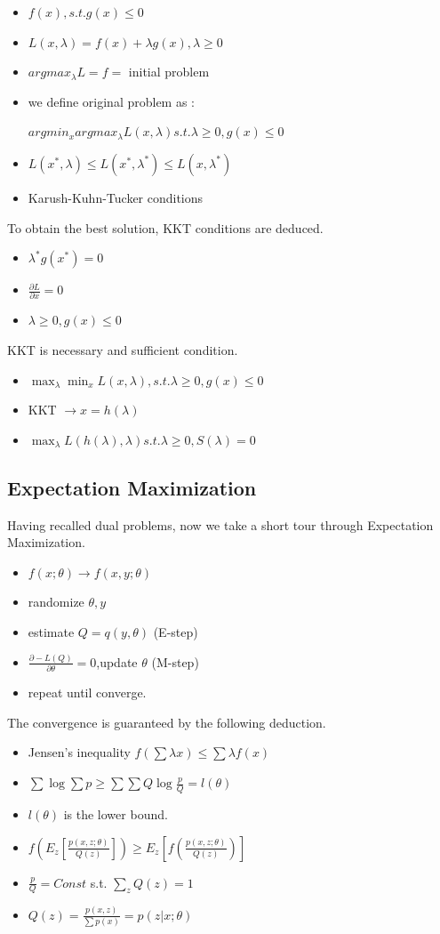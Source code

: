 \documentclass[UTF8, 11pt, a4paper]{ctexart}
\begin{document}
\begin{itemize}
\item $f(x), s.t. g(x) \le 0$
\item $L(x,\lambda) = f(x) + \lambda g(x), \lambda \geq 0$
\item $argmax_\lambda L = f =$ initial problem
\item we define original problem as :

$argmin_x argmax_\lambda L(x,\lambda) s.t. \lambda \geq 0, g(x) \leq 0$

\item $ L(x^*,\lambda) \leq L(x^*,\lambda^*)  \leq L(x,\lambda^*)$
\item Karush-Kuhn-Tucker conditions
\end{itemize}
To obtain the best solution, KKT conditions are deduced.
\begin{itemize}
\item $\lambda^* g(x^*)=0$
\item $\frac{\partial L}{  \partial x} =0$ 
\item $\lambda \geq 0 , g(x) \leq 0$
\end{itemize}
KKT is necessary and sufficient condition.
\begin{itemize}
\item $\max_\lambda \min_x L(x,\lambda) , s.t. \lambda \geq 0, g(x) \leq 0$
\item KKT $\rightarrow x=h(\lambda)$
\item $\max_\lambda L(h(\lambda),\lambda) s.t. \lambda \geq 0, S(\lambda)=0$
\end{itemize}


\subsection{Expectation Maximization}
Having recalled dual problems, now we take a short tour through Expectation Maximization.
\begin{itemize}
\item $f(x;\theta) \rightarrow f(x,y;\theta)$
\item randomize $\theta, y$
\item estimate $Q=q(y,\theta)$ (E-step)
\item $\frac{\partial -L(Q)}{\partial \theta}=0$,update $\theta$ (M-step)
\item repeat until converge.
\end{itemize}
The convergence is guaranteed by the following deduction.
\begin{itemize}
\item Jensen's inequality $f(\sum \lambda x) \leq \sum \lambda f(x)$
\item $\sum \log \sum p \geq \sum \sum Q \log \frac{p}{Q}=l(\theta) $
\item $l(\theta)$ is the lower bound. 
\item $f(E_z[\frac{p(x,z;\theta)}{Q(z)}]) \geq E_z[f(\frac{p(x,z;\theta)}{Q(z)})]$
\item $\frac{p}{Q}=Const$ s.t. $\sum_z Q(z)=1$
\item $Q(z)=\frac{p(x,z)}{\sum p(x)}=p(z|x;\theta)$
\end{itemize}
\end{document}
